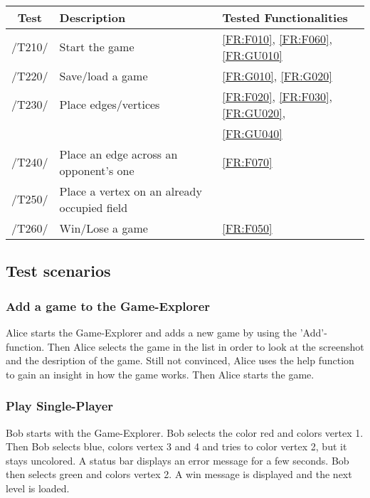 \subsubsection{\twixt}

\begin{tabular}{cll}

\hline
\textbf{Test} & \textbf{Description} & \textbf{Tested Functionalities} \\
\hline
/T210/ & Start the game & \ref{FR:F010}, \ref{FR:F060}, \ref{FR:GU010} \\
/T220/ & Save/load a game & \ref{FR:G010}, \ref{FR:G020} \\
/T230/ & Place edges/vertices & \ref{FR:F020}, \ref{FR:F030}, \ref{FR:GU020}, \\ 
& & \ref{FR:GU040} \\
/T240/ & Place an edge across an opponent's one & \ref{FR:F070} \\
/T250/ & Place a vertex on an already occupied field & \\
/T260/ & Win/Lose a game & \ref{FR:F050} \\
\hline

\end{tabular}

\subsection{Test scenarios}

\subsubsection{Add a game to the Game-Explorer}

Alice starts the Game-Explorer and adds a new game by using the 'Add'-function. Then Alice selects the game in the list in order to look at the screenshot and the desription of the game. Still not convinced, Alice uses the help function to gain an insight in how the game works. Then Alice starts the game.

\subsubsection{Play {\graphcoloring} Single-Player} \label{T:GCSingle}

Bob starts {\graphcoloring} with the Game-Explorer. Bob selects the color red and colors vertex 1. Then Bob selects blue, colors vertex 3 and 4 and tries to color vertex 2, but it stays uncolored. A status bar displays an error message for a few seconds. Bob then selects green and colors vertex 2. A win message is displayed and the next level is loaded.

